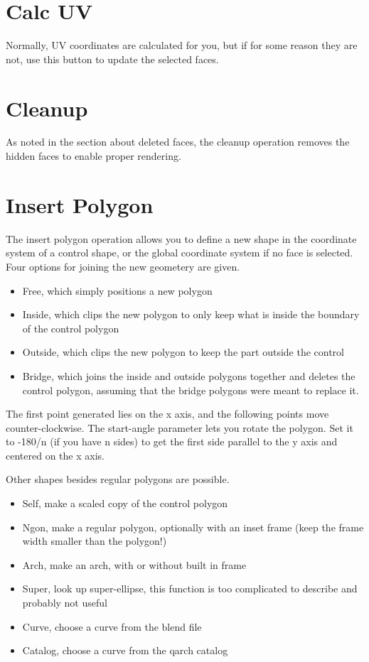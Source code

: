 \documentclass[11pt]{article}
\begin{document}
    \section{Calc UV}
    Normally, UV coordinates are calculated for you, but if for some reason they are not, use this button to update
    the selected faces.

    \section{Cleanup}
    As noted in the section about deleted faces, the cleanup operation removes the hidden faces to enable proper
    rendering.

    \section{Insert Polygon}
    The insert polygon operation allows you to define a new shape in the coordinate system of a control shape, or the
    global coordinate system if no face is selected. Four options for joining the new geometery are given.
    \begin{itemize}
        \item Free, which simply positions a new polygon
        \item Inside, which clips the new polygon to only keep what is inside the boundary of the control polygon
        \item Outside, which clips the new polygon to keep the part outside the control
        \item Bridge, which joins the inside and outside polygons together and deletes the control polygon, assuming
        that the bridge polygons were meant to replace it.
    \end{itemize}
    The first point generated lies on the x axis, and the following points move counter-clockwise.
    The start-angle parameter lets you rotate the polygon.
    Set it to -180/n (if you have n sides) to get the first side parallel to the y axis and centered on the x axis.

    Other shapes besides regular polygons are possible.
    \begin{itemize}
        \item Self, make a scaled copy of the control polygon
        \item Ngon, make a regular polygon, optionally with an inset frame (keep the frame width smaller than the polygon!)
        \item Arch, make an arch, with or without built in frame
        \item Super, look up super-ellipse, this function is too complicated to describe and probably not useful
        \item Curve, choose a curve from the blend file
        \item Catalog, choose a curve from the qarch catalog
    \end{itemize}
\end{document}
